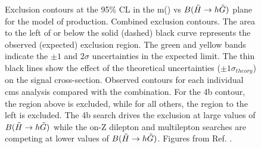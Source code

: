 \begin{figure}[htbp]
	\centering 
	\caption{
	Exclusion contours at the 95\% CL in the m(\ninoone) vs $B(\tilde{H}\rightarrow h \tilde{G})$ plane for the model of \ninoone\ninoone production.
	Combined exclusion contours. The area to the left of or below the solid (dashed) black curve represents the observed (expected) exclusion region. The green and yellow bands indicate the $\pm1$ and $2\sigma$ uncertainties in the expected limit. The thin black lines show the effect of the theoretical uncertainties ($\pm1\sigma_{theory}$) on the signal cross-section.
	Observed contours for each individual \gls{cms} analysis compared with the combination. For the 4b contour, the region above is excluded, while for all others, the region to the left is excluded. The 4b search drives the exclusion at large values of $B(\tilde{H}\rightarrow h \tilde{G})$ while the on-Z dilepton and multilepton searches are competing at lower values of $B(\tilde{H}\rightarrow h \tilde{G})$.
	Figures from Ref. \cite{Sirunyan:2018ubx}.
		}
	\label{fig:limits_higgsino_cms}
\end{figure}

